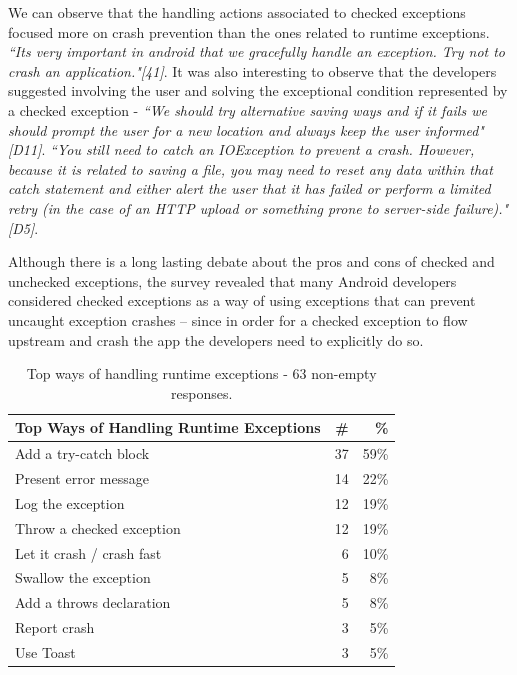 We can observe that the handling actions associated to checked exceptions focused more on crash prevention than the ones related to runtime exceptions. \emph{``Its very important in android that we gracefully handle an exception. Try not to crash an application."[41]}. It was also interesting to observe that the developers suggested involving the user and solving the exceptional condition represented by a checked exception - \emph{``We should try alternative saving ways and if it fails we should prompt the user for a new location and always keep the user informed"[D11]}. \emph{``You still need to catch an IOException to prevent a crash. However, because it is related to saving a file, you may need to reset any data within that catch statement and either alert the user that it has failed or perform a limited retry (in the case of an HTTP upload or something prone to server-side failure)."[D5]}.

 Although there is a long lasting debate about the pros and cons of checked and unchecked exceptions, the survey revealed that many Android developers considered checked exceptions as a way of using exceptions that can prevent uncaught exception crashes -- since in order for a checked exception to flow upstream and crash the app the developers need to explicitly do so. 				

\begin{table}
\scriptsize
\centering
\begin{tabular}{lrr}
\hline
\bfseries{Top Ways of Handling Runtime Exceptions} & \bfseries{\#} & \bfseries{\%} \\
\hline
Add a try-catch block &	37 &	59\% \\
Present error message	&  14 &	22\% \\
Log the exception	& 12 &	19\% \\
Throw a checked exception	& 12 & 19\% \\
Let it crash / crash fast 	& 6 &	10\% \\
Swallow the exception	& 5 &	8\% \\
Add a throws declaration	& 5 &	8\% \\
Report crash &	3 &	5\% \\
Use Toast & 	3 &	5\% \\
\hline
\end{tabular}
\caption{Top ways of handling runtime exceptions -  63 non-empty responses. }
\label{tab:handlingruntime}
\end{table}		


